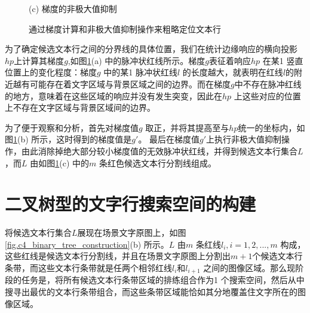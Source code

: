 \begin{figure}[!h]
\begin{minipage}[t]{0.32\linewidth}
        \centerline{\small (c) 梯度的非极大值抑制}
        \end{minipage}
        \caption{通过梯度计算和非极大值抑制操作来粗略定位文本行}
        \label{fig.c4_candidate_line_construction}
        \end{figure}

        为了确定候选文本行之间的分界线的具体位置，我们在统计边缘响应的横向投影$hp$上计算其梯度$g$,如图\ref{fig.c4_candidate_line_construction}(a) 中的脉冲状红线所示。梯度$g$表征着响应$hp$ 在某1 竖直位置上的变化程度：梯度$g$ 中的某1 脉冲状红线$l$ 的长度越大，就表明在红线$l$的附近越有可能存在着文字区域与背景区域之间的边界。而在梯度$g$中不存在脉冲红线的地方，意味着在这些区域的响应并没有发生突变，因此在$hp$ 上这些对应的位置上不存在文字区域与背景区域间的边界。

        为了便于观察和分析，首先对梯度值$g$ 取正，并将其提高至与$hp$统一的坐标内，如图\ref{fig.c4_candidate_line_construction}(b) 所示，这时得到的梯度值是$g$$'$。 最后在梯度值$g$$'$上执行非极大值抑制操作，由此消除掉绝大部分较小梯度值的无效脉冲状红线，并得到候选文本行集合$L$，而$L$ 由如图\ref{fig.c4_candidate_line_construction}(c) 中的$m$ 条红色候选文本行分割线组成。

    \section{二叉树型的文字行搜索空间的构建}

    将候选文本行集合$L$展现在场景文字原图上，如图\ref{fig.c4_binary_tree_construction}(b) 所示。$L$ 由$m$ 条红线$l_i, i=1,2,...,m$ 构成，这些红线是候选文本行分割线，并且在场景文字原图上分割出$m+1$个候选文本行条带，而这些文本行条带就是任两个相邻红线$l_i$和$l_{i+1}$ 之间的图像区域。那么现阶段的任务是，将所有候选文本行条带区域的排练组合作为1 个搜索空间，然后从中搜寻出最优的文本行条带组合，而这些条带区域能恰如其分地覆盖住文字所在的图像区域。

